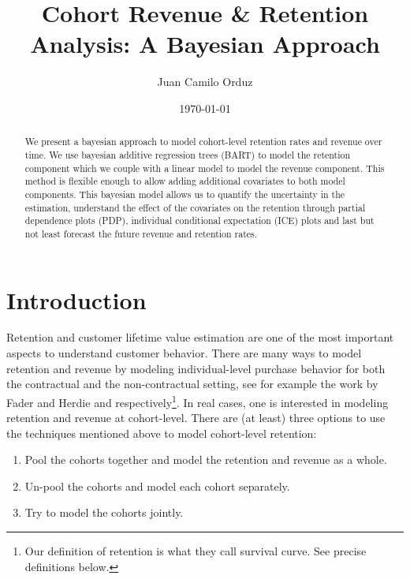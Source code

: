 \documentclass[11pt]{amsart}
\begin{document}
\title{Cohort Revenue \& Retention Analysis: A Bayesian Approach}
\author{Juan Camilo Orduz}
\address{Berlin, Germany}
\date{\today}

\begin{abstract}
We present a bayesian approach to model cohort-level retention rates and revenue over
time. We use bayesian additive regression trees (BART) to model the retention
component which we couple with a linear model to model the revenue component.
This method is flexible enough to allow adding additional covariates to both model
components. This bayesian model allows us to quantify the uncertainty in the
estimation, understand the effect of the covariates on the retention through partial
dependence plots (PDP), individual conditional expectation (ICE) plots and last but not
least forecast the future revenue and retention rates.
\end{abstract}

\maketitle

\tableofcontents

\section{Introduction}

Retention and customer lifetime value estimation are one of the most important aspects
to understand customer behavior. There are many ways to model retention and revenue 
by modeling individual-level purchase behavior for both the contractual and the
non-contractual setting, see for example the work by Fader and Herdie
\cite{FaderHardie2007} and \cite{FaderHardie2005} respectively\footnote{Our definition
of retention is what they call survival curve. See precise definitions below.}. In real
cases, one is interested in modeling retention and revenue at cohort-level. There are
(at least) three options to use the techniques mentioned above to model cohort-level
retention:

\begin{enumerate}
    \item Pool the cohorts together and model the retention and revenue as a whole.
    \item Un-pool the cohorts and model each cohort separately.
    \item Try to model the cohorts jointly.
\end{enumerate}
\end{document}

